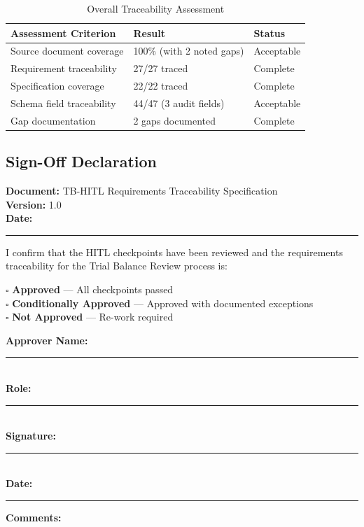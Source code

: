 \documentclass[11pt,a4paper,twoside]{report}
\begin{document}
\begin{table}[h]
\centering
\caption{Overall Traceability Assessment}
\begin{tabular}{@{}L{6cm}C{4cm}C{3cm}@{}}
\toprule
\textbf{Assessment Criterion} & \textbf{Result} & \textbf{Status} \\
\midrule
Source document coverage & 100\% (with 2 noted gaps) & Acceptable \\
Requirement traceability & 27/27 traced & Complete \\
Specification coverage & 22/22 traced & Complete \\
Schema field traceability & 44/47 (3 audit fields) & Acceptable \\
Gap documentation & 2 gaps documented & Complete \\
\bottomrule
\end{tabular}
\end{table}

\subsection{Sign-Off Declaration}

\begin{tcolorbox}[colback=white,colframe=sapblue,title=Final Sign-Off Declaration]
\textbf{Document:} TB-HITL Requirements Traceability Specification \\
\textbf{Version:} 1.0 \\
\textbf{Date:} \rule{3cm}{0.4pt}

\vspace{0.5cm}

I confirm that the HITL checkpoints have been reviewed and the requirements
traceability for the Trial Balance Review process is:

\vspace{0.3cm}
$\square$ \textbf{Approved} --- All checkpoints passed \\
$\square$ \textbf{Conditionally Approved} --- Approved with documented exceptions \\
$\square$ \textbf{Not Approved} --- Re-work required

\vspace{0.5cm}

\textbf{Approver Name:} \rule{5cm}{0.4pt} \\
\textbf{Role:} \rule{5cm}{0.4pt} \\
\textbf{Signature:} \rule{5cm}{0.4pt} \\
\textbf{Date:} \rule{3cm}{0.4pt}

\vspace{0.3cm}

\textbf{Comments:}
\vspace{1.5cm}
\end{tcolorbox}
\end{document}
